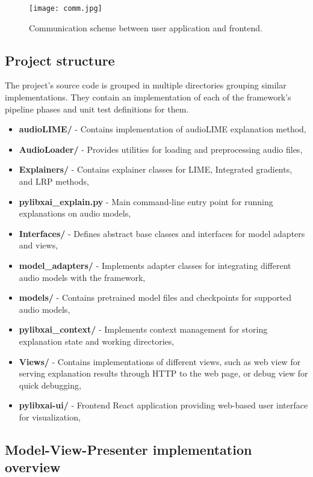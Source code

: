 \documentclass[
    bindingoffset=5mm,  %
    footnoteindent=3mm, %
    hyphenation=true    %
]{src/wut-thesis}
\begin{document}
\begin{figure}[h!] %
    \centering
    \texttt{[image: comm.jpg]}
    \caption{Communication scheme between user application and frontend.}
    \label{fig:CommunicationArchitecture}
\end{figure}

\subsection{Project structure}

    The project’s source code is grouped in multiple directories grouping similar implementations. They contain an implementation of each of the framework’s pipeline phases
    and unit test definitions for them.

\begin{itemize}[itemsep=1\baselineskip]
	\item \textbf{audioLIME/} - Contains implementation of audioLIME explanation method,
	\item \textbf{AudioLoader/} - Provides utilities for loading and preprocessing audio files,
	\item \textbf{Explainers/} - Contains explainer classes for LIME, Integrated gradients, and LRP methods,
	\item \textbf{pylibxai\_explain.py} - Main command-line entry point for running explanations on audio models,
	\item \textbf{Interfaces/} - Defines abstract base classes and interfaces for model adapters and views,
	\item \textbf{model\_adapters/} - Implements adapter classes for integrating different audio models with the framework,
	\item \textbf{models/} - Contains pretrained model files and checkpoints for supported audio models,
	\item \textbf{pylibxai\_context/} - Implements context management for storing explanation state and working directories,
	\item \textbf{Views/} - Contains implementations of different views, such as web view for serving explanation results through HTTP to the web page, or debug view for quick debugging,
	\item \textbf{pylibxai-ui/} - Frontend React application providing web-based user interface for visualization,
\end{itemize}

\subsection{Model-View-Presenter implementation overview}
\end{document}
